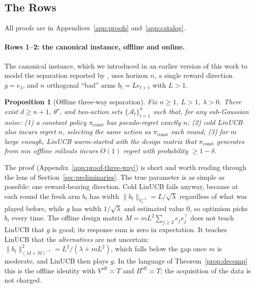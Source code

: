 \documentclass{article}
\newtheorem{proposition}{Proposition}
\theoremstyle{definition}
\theoremstyle{remark}
\theoremstyle{remark}
\begin{document}
\subsection{The Rows}
\label{sec:canonical}

All proofs are in Appendices~\ref{app:proofs} and~\ref{app:catalog}.


\paragraph{Rows 1--2: the canonical instance, offline and online.}
The canonical instance, which we introduced in an earlier version of this
work to model the separation reported by \cite{chen2024llmdecision}, uses
horizon $n$, a single reward direction $g=e_1$, and $n$ orthogonal ``bad''
arms $b_t=Le_{t+1}$ with $L>1$.

\begin{proposition}[Offline three-way separation]
\label{prop:three-way}
Fix $n\ge1$, $L>1$, $\lambda>0$. There exist $d\ge n+1$, $\theta^\star$, and
two-action sets $\{\mathcal A_t\}_{t=1}^n$ such that, for any sub-Gaussian
noise: (1) a constant policy $\pi_{\mathrm{const}}$ has pseudo-regret exactly
$n$; (2) cold LinUCB also incurs regret $n$, selecting the same action as
$\pi_{\mathrm{const}}$ each round; (3) for $m$ large enough, LinUCB
warm-started with the design matrix that $\pi_{\mathrm{const}}$ generates from
$mn$ \emph{offline} rollouts incurs $O(1)$ regret with probability $\ge1-\delta$.
\end{proposition}

The proof (Appendix~\ref{app:proof-three-way}) is short and worth reading
through the lens of Section~\ref{sec:preliminaries}. The true parameter is as
simple as possible: one reward-bearing direction. Cold LinUCB fails anyway,
because at each round the fresh arm $b_t$ has width $\|b_t\|_{V_t^{-1}}=L/\sqrt\lambda$
regardless of what was played before, while $g$ has width $1/\sqrt\lambda$ and
estimated value $0$, so optimism picks $b_t$ every time. The offline design
matrix $M=mL^2\sum_{j\ge2}e_je_j^\top$ does not teach LinUCB that $g$ is good;
its response sum is zero in expectation. It teaches LinUCB that the
\emph{alternatives} are not uncertain: $\|b_t\|^2_{(\lambda I+M)^{-1}}=L^2/(\lambda+mL^2)$,
which falls below the gap once $m$ is moderate, and LinUCB then plays $g$.
In the language of Theorem~\ref{prop:decomp} this is the offline identity with
$V^{\mathrm{off}}\asymp T$ and $B^{\mathrm{off}}\asymp T$; the acquisition of
the data is not charged.
\end{document}
